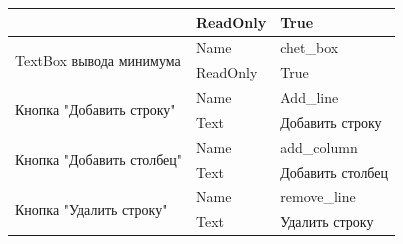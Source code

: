 \begin{table}[H]
\begin{tabular}{|l|l|l|}
                                                                                 & ReadOnly                                                                       & True                                                                          \\ \hline
\multirow{2}{*}{TextBox вывода минимума}                                         & Name                                                                           & chet\_box                                                                     \\ \cline{2-3} 
                                                                                 & ReadOnly                                                                       & True                                                                          \\ \hline
\multirow{2}{*}{Кнопка "Добавить строку"}                                        & Name                                                                           & Add\_line                                                                     \\ \cline{2-3} 
                                                                                 & Text                                                                           & Добавить строку                                                               \\ \hline
\multirow{2}{*}{Кнопка "Добавить столбец"}                                       & Name                                                                           & add\_column                                                                   \\ \cline{2-3} 
                                                                                 & Text                                                                           & Добавить столбец                                                              \\ \hline
\multirow{2}{*}{Кнопка "Удалить строку"}                                         & Name                                                                           & remove\_line                                                                  \\ \cline{2-3} 
                                                                                 & Text                                                                           & Удалить строку                                                                \\ \hline

\end{tabular}
\end{table}
